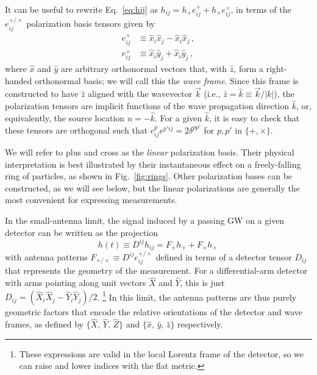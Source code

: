 \documentclass[aps,prd,twocolumn,superscriptaddress,preprintnumbers,floatfix,nofootinbib]{revtex4-2}
\newcommand{\beq}{\begin{equation}}
\newcommand{\eeq}{\end{equation}}
\newcommand*{\eq}[1]{Eq.~\eqref{eq:#1}}
\begin{document}
It can be useful to rewrite \eq{hij} as $h_{ij} = h_+ e^+_{ij} + h_\times e^\times_{ij}$, in terms of the $e^{+/\times}_{ij}$ polarization basis tensors given by
\begin{subequations} \label{eq:lin}
\begin{align}
e^+_{ij} &\equiv \hat{x}_i \hat{x}_j - \hat{x}_i \hat{x}_j \, ,\\
e^\times_{ij} &\equiv \hat{x}_i \hat{y}_j + \hat{x}_i \hat{y}_j\, ,
\end{align}
\end{subequations}
where $\hat{x}$ and $\hat{y}$ are arbitrary orthonormal vectors that, with $\hat{z}$, form a right-handed orthonormal basis; we will call this the \emph{wave frame}.
Since this frame is constructed to have $\hat{z}$ aligned with the wavevector $\vec{k}$ (i.e., $\hat{z} = \hat{k} \equiv \vec{k}/|k|$), the polarization tensors are implicit functions of the wave propagation direction $\hat{k}$, or, equivalently, the source location $\hat{n} = -\hat{k}$.
For a given $\hat{k}$, it is easy to check that these tensors are orthogonal such that $e^p_{ij} e^{p'ij}=2\delta^{pp'}$ for $p,p'$ in $\{+,\times\}$.

We will refer to plus and cross as the \emph{linear} polarization basis.
Their physical interpretation is best illustrated by their instantaneous effect on a freely-falling ring of particles, as shown in Fig.~\ref{fig:rings}.
Other polarization bases can be constructed, as we will see below, but the linear polarizations are generally the most convenient for expressing measurements.

In the small-antenna limit, the signal induced by a passing GW on a given detector can be written as the projection
\beq \label{eq:h}
h(t) \equiv D^{ij} h_{ij} = F_+ h_+ + F_\times h_\times\, 
\eeq
with antenna patterns $F_{+/\times} \equiv D^{ij} e^{+/\times}_{ij}$ defined in terms of a detector tensor $D_{ij}$ that represents the geometry of the measurement.
For a differential-arm detector with arms pointing along unit vectors $\hat{X}$ and $\hat{Y}$, this is just $D_{ij} = (\hat{X}_i \hat{X}_j - \hat{Y}_i \hat{Y}_j)/2$.%
\footnote{These expressions are valid in the local Lorentz frame of the detector, so we can raise and lower indices with the flat metric.}
In this limit, the antenna patterns are thus purely geometric factors that encode the relative orientations of the detector and wave frames, as defined by $\{\hat{X},\, \hat{Y},\, \hat{Z}\}$ and $\{\hat{x},\, \hat{y},\, \hat{z}\}$ respectively.
\end{document}
